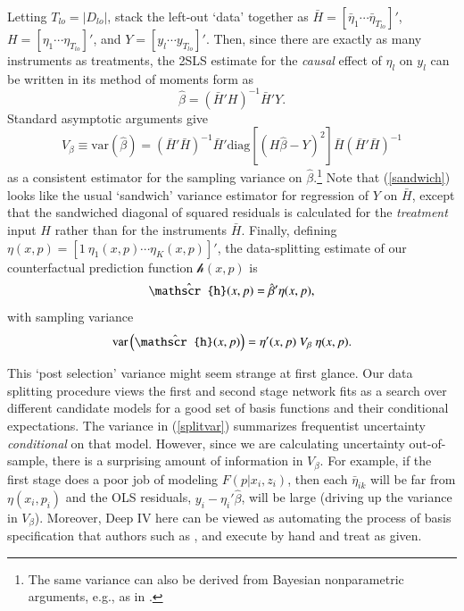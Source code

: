 \documentclass[12pt]{article}
\newcommand{\mr}[1]{\mathrm{#1}}
\newcommand{\cf}{\ensuremath{\mathscr{h}}}
\newcommand{\cfEst}{\ensuremath{\skew{4}\hat{\mathscr{h}}}}
\begin{document}
Letting $T_{lo} =|D_{lo}|$, stack the left-out `data' together as ${\bar H} = [{\bar\eta}_{1} \cdots {\bar\eta}_{T_{lo}}]'$,  ${H} = [{\eta}_{1} \cdots {\eta}_{T_{lo}}]'$, and $Y = [y_l \cdots y_{T_{lo}}]'$.
Then, since there are exactly as many instruments as treatments, the 2SLS estimate for the {\it causal} effect of ${\eta}_{l}$  on $y_l$ can be written in its method of moments  form as 
\begin{equation}
\hat \beta =  ({\bar H}'H)^{-1}{\bar{H}}'Y.
\end{equation}
Standard asymptotic arguments \citep[e.g.,][]{angrist2008mostly} give
\begin{equation}\label{sandwich}
 V_\beta \equiv \mr{var}(\hat\beta) = ({\bar H}'{\bar H})^{-1}{\bar H}'
 \mr{diag}\left[({H}\hat\beta - Y)^2\right]{\bar H}({\bar H}'{\bar H})^{-1}
 \end{equation} 
 as a consistent estimator for the sampling variance on $\hat\beta$.\footnote{The same variance can also be derived from Bayesian nonparametric arguments, e.g., as in \cite{taddy_heterogeneous_2015}.} 
 Note that (\ref{sandwich}) looks like the usual `sandwich' variance estimator \citep{white_heteroskedasticity-consistent_1980} for regression of $Y$ on ${\bar H}$, except that the sandwiched diagonal of squared residuals is calculated for the {\it treatment} input $H$
 rather than for the instruments $\bar H$.
 Finally, defining ${\eta}(x,p) =[1~\eta_{1}(x,p) \cdots \eta_{K}(x,p)]'$, the data-splitting estimate of our counterfactual prediction function $\cf(x,p)$ is 
 \begin{equation}
 \cfEst(x,p) = \hat\beta'{\eta}(x,p),
 \end{equation} with sampling variance 
 \begin{equation}\label{splitvar}
 \mr{var}\left(\cfEst(x,p)\right) = {\eta}'(x,p)~V_\beta~{\eta}(x,p).
 \end{equation}

This `post selection' variance might seem strange at first glance.  Our data splitting procedure views the first and second stage network fits as a search over different candidate models for a good set of basis functions and their conditional expectations. The variance in (\ref{splitvar})  summarizes frequentist uncertainty {\it conditional} on that model. 
However, since we are calculating uncertainty out-of-sample, there is a surprising amount of information in $V_\beta$.  For example, if the first stage does a poor job of modeling $F(p|x_i,z_i)$, then each $\bar\eta_{ik}$ will be far from $\eta(x_i,p_i)$ and the OLS residuals, $y_i - {\eta}_i'\hat\beta$, will be large (driving up the variance in $V_\beta$).  Moreover, Deep IV here can be viewed as automating the process of basis specification that authors such as \cite{newey2003instrumental,BCK2007}, and \cite{chenpouzo12} execute by hand and treat as given.
\end{document}
